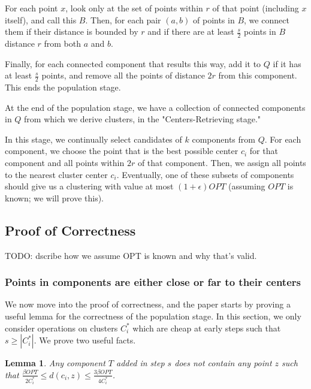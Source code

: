 \documentclass[paper=a4, fontsize=10.5pt]{scrartcl} %
\numberwithin{equation}{section} %
\numberwithin{figure}{section} %
\numberwithin{table}{section} %
\newtheorem{lemma}[theorem]{Lemma}
\begin{document}
For each point $x$, look only at the set of points within $r$ of that point (including $x$ itself), and call this $B$.  Then, for each pair $(a, b)$ of points in $B$, we connect them if their distance is bounded by $r$ and if there are at least $\frac{s}{2}$ points in $B$ distance $r$ from both $a$ and $b$.

Finally, for each connected component that results this way, add it to $Q$ if it has at least $\frac{s}{2}$ points, and remove all the points of distance $2r$ from this component.  This ends the population stage.


At the end of the population stage, we have a collection of connected components in $Q$ from which we derive clusters, in the "Centers-Retrieving stage."

In this stage, we continually select candidates of $k$ components from $Q$.  For each component, we choose the point that is the best possible center $c_i$ for that component and all points within $2r$ of that component.  Then, we assign all points to the nearest cluster center $c_i$.  Eventually, one of these subsets of components should give us a clustering with value at most $(1 + \epsilon) OPT$ (assuming $OPT$ is known; we will prove this).

\subsection{Proof of Correctness}

TODO: dscribe how we assume OPT is known and why that's valid.

\subsubsection{Points in components are either close or far to their centers}
We now move into the proof of correctness, and the paper starts by proving a useful lemma for the correctness of the population stage.  In this section, we only consider operations on clusters $C^*_i$ which are cheap at early steps such that $s \geq |C^*_i|$.  We prove two useful facts.

\begin{lemma}
Any component $T$ added in step $s$ does not contain any point $z$ such that $\frac{\beta OPT}{2 C^*_i} \leq  d(c_i, z) \leq \frac{3 \beta OPT}{4 C^*_i}$.
\label{lemma:4.2a}
\end{lemma}
\end{document}
